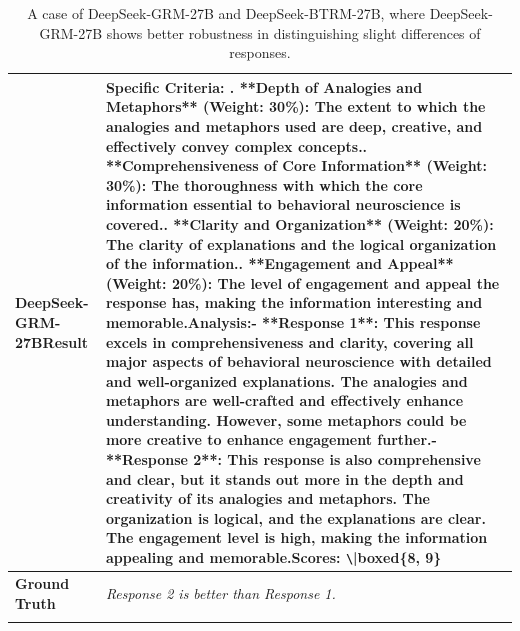 \documentclass{article} %
\newcommand{\SGRM}{DeepSeek-GRM-27B\xspace}
\newcommand{\BTRM}{DeepSeek-BTRM\xspace}
\begin{document}
\begin{center}
\begin{longtable}{p{2.8cm}|p{10cm}}
   \textbf{\SGRM\newline Result}   &     Specific Criteria: \newline 1. **Depth of Analogies and Metaphors** (Weight: 30\%): The extent to which the analogies and metaphors used are deep, creative, and effectively convey complex concepts.\newline 2. **Comprehensiveness of Core Information** (Weight: 30\%): The thoroughness with which the core information essential to behavioral neuroscience is covered.\newline 3. **Clarity and Organization** (Weight: 20\%): The clarity of explanations and the logical organization of the information.\newline 4. **Engagement and Appeal** (Weight: 20\%): The level of engagement and appeal the response has, making the information interesting and memorable.\newline\newline Analysis:\newline - **Response 1**: This response excels in comprehensiveness and clarity, covering all major aspects of behavioral neuroscience with detailed and well-organized explanations. The analogies and metaphors are well-crafted and effectively enhance understanding. However, some metaphors could be more creative to enhance engagement further.\newline - **Response 2**: This response is also comprehensive and clear, but it stands out more in the depth and creativity of its analogies and metaphors. The organization is logical, and the explanations are clear. The engagement level is high, making the information appealing and memorable.\newline\newline Scores: \verb|\|boxed\{8, 9\}   \\ \midrule
   \textbf{Ground Truth}   &     \textit{Response 2 is better than Response 1.}     \\
\bottomrule
\caption{A case of \SGRM and \BTRM-27B, where \SGRM shows better robustness in distinguishing slight differences of responses.}\label{tab:cases-1}
\end{longtable}
\end{center}
\end{document}

